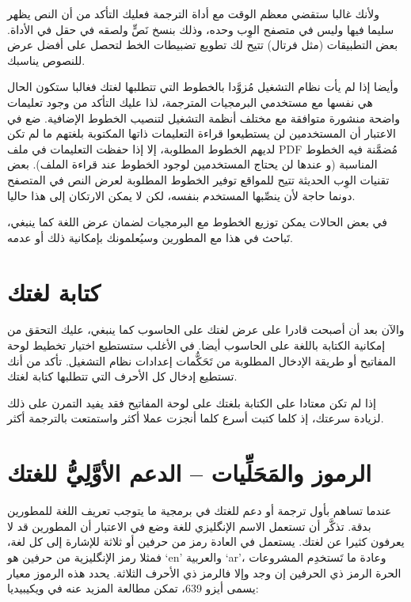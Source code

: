 ولأنك غالبا ستقضي معظم الوقت مع أداة الترجمة فعليك التأكد من أن النص
يظهر سليما فيها وليس في متصفح الوِب وحده، وذلك بنسخ نَصٍّ ولصقه في حقل
في الأداة. بعض التطبيقات (مثل فرتال) تتيح لك تطويع تضبيطات الخط لتحصل
على أفضل عرض للنصوص يناسبك.

وأيضا إذا لم يأت نظام التشغيل مُزوَّدا بالخطوط التي تتطلبها لغتك فغالبا
ستكون الحال هي نفسها مع مستخدمي البرمجيات المترجمة، لذا عليك التأكد من
وجود تعليمات واضحة منشورة متوافقة مع مختلف أنظمة التشغيل لتنصيب الخطوط
الإضافية. ضع في الاعتبار أن المستخدمين لن يستطيعوا قراءة التعليمات
ذاتها المكتوبة بلغتهم ما لم تكن لديهم الخطوط المطلوبة، إلا إذا حفظت
التعليمات في ملف PDF مُضمَّنة فيه الخطوط المناسبة (و عندها لن يحتاج
المستخدمين لوجود الخطوط عند قراءة الملف). بعض تقنيات الوِب الحديثة تتيح
للمواقع توفير الخطوط المطلوبة لعرض النص في المتصفح دونما حاجة لأن
ينصِّبها المستخدم بنفسه، لكن لا يمكن الارتكان إلى هذا حاليا.

في بعض الحالات يمكن توزيع الخطوط مع البرمجيات لضمان عرض اللغة كما ينبغي،
تَباحث في هذا مع المطورين وسيُعلمونك بإمكانية ذلك أو عدمه.

\section{كتابة لغتك}
والآن بعد أن أصبحت قادرا على عرض لغتك على الحاسوب كما ينبغي، عليك التحقق
من إمكانية الكتابة باللغة على الحاسوب أيضا. في الأغلب ستستطيع اختيار
تخطيط لوحة المفاتيح أو طريقة الإدخال المطلوبة من تَحَكُّمات إعدادات
نظام التشغيل. تأكد من أنك تستطيع إدخال كل الأحرف التي تتطلبها كتابة
لغتك.

إذا لم تكن معتادا على الكتابة بلغتك على لوحة المفاتيح فقد يفيد التمرن
على ذلك لزيادة سرعتك، إذ كلما كتبت أسرع كلما أنجزت عملا أكثر واستمتعت
بالترجمة أكثر.

\section[ref:34561726]{الرموز والمَحَلِّيات – الدعم الأوَّلِيُّ للغتك}
عندما تساهم بأول ترجمة أو دعم
للغتك في برمجية ما يتوجب تعريف اللغة للمطورين بدقة. تذكَّر أن تستعمل
الاسم الإنگليزي للغة وضع في الاعتبار أن المطورين قد لا يعرفون كثيرا عن
لغتك. يستعمل في العادة رمز من حرفين أو ثلاثة للإشارة إلى كل لغة، فمثلا
رمز الإنگليزية من حرفين هو ‘en’ والعربية ‘ar’، وعادة ما تَستخدِم
المشروعات الحرة الرمز ذي الحرفين إن وجد وإلا فالرمز ذي الأحرف الثلاثة.
يحدد هذه الرموز معيار يسمى أيزو 639، تمكن مطالعة المزيد عنه في
ويكيبيديا:


